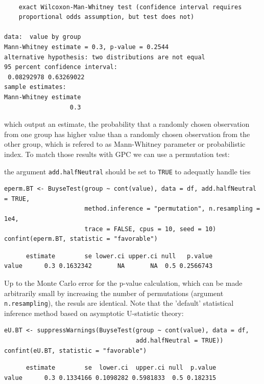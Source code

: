 \documentclass[12pt]{article}
\newcommand\Warning[1][3ex]{%
\renewcommand\stacktype{L}%
\scaleto{\stackon[1.3pt]{\color{red}$\triangle$}{\tiny\bfseries !}}{#1}%
\xspace
}
\begin{document}
\begin{verbatim}

	exact Wilcoxon-Man-Whitney test (confidence interval requires
	proportional odds assumption, but test does not)

data:  value by group
Mann-Whitney estimate = 0.3, p-value = 0.2544
alternative hypothesis: two distributions are not equal
95 percent confidence interval:
 0.08292978 0.63269022
sample estimates:
Mann-Whitney estimate 
                  0.3
\end{verbatim}

\noindent which output an estimate, the probability that a randomly
chosen observation from one group has higher value than a randomly
chosen observation from the other group, which is refered to as
Mann-Whitney parameter or probabilistic index. To match those results
with GPC we can use a permutation test: \newline \Warning the argument
\texttt{add.halfNeutral} should be set to \texttt{TRUE} to adequatly handle ties
\lstset{language=r,label= ,caption= ,captionpos=b,numbers=none}
\begin{lstlisting}
eperm.BT <- BuyseTest(group ~ cont(value), data = df, add.halfNeutral = TRUE,
                      method.inference = "permutation", n.resampling = 1e4,
                      trace = FALSE, cpus = 10, seed = 10)
confint(eperm.BT, statistic = "favorable")
\end{lstlisting}

\begin{verbatim}
      estimate        se lower.ci upper.ci null   p.value
value      0.3 0.1632342       NA       NA  0.5 0.2566743
\end{verbatim}


Up to the Monte Carlo error for the p-value calculation, which can be
made arbitrarily small by increasing the number of permutations
(argument \texttt{n.resampling}), the resuls are identical. Note that the
'default' statistical inference method based on asymptotic
U-statistic theory:
\lstset{language=r,label= ,caption= ,captionpos=b,numbers=none}
\begin{lstlisting}
eU.BT <- suppressWarnings(BuyseTest(group ~ cont(value), data = df,
                                    add.halfNeutral = TRUE))
confint(eU.BT, statistic = "favorable")
\end{lstlisting}

\begin{verbatim}
      estimate        se  lower.ci  upper.ci null  p.value
value      0.3 0.1334166 0.1098282 0.5981833  0.5 0.182315
\end{verbatim}
\end{document}
